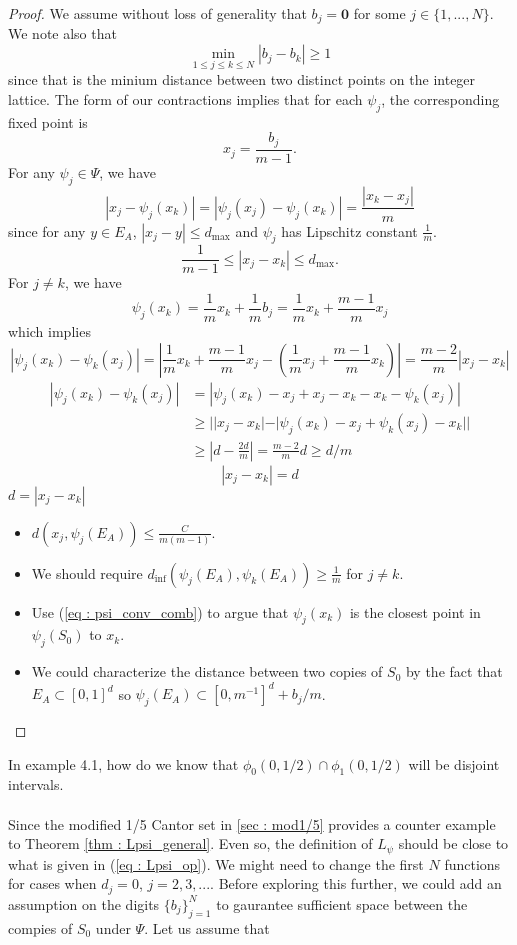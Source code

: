 \documentclass [52pt] {article}
\begin{document}
\begin{proof}
We assume without loss of generality that $b_j = \mathbf{0}$ for some $j\in\{1,...,N\}$.  We note also that 
\[\min_{1\le j\le k\le N}|b_j - b_k| \ge 1\]
since that is the minium distance between two distinct points on the integer lattice.  The form of our contractions implies that for each $\psi_j$, the corresponding fixed point is 
\[x_j = \frac{b_j}{m-1}.\]
For any $\psi_j\in\Psi$, we have
\[|x_j-\psi_j(x_k)|= |\psi_j(x_j) - \psi_j(x_k)| = \frac{|x_k-x_j|}{m}\]
since for any $y\in E_A$, $|x_j-y|\le d_{\max}$ and $\psi_j$ has Lipschitz constant $\frac{1}{m}$.
\[\frac{1}{m-1}\le |x_j-x_k|\le d_{\max}.\]
For $j\not=k$, we have
\begin{equation}\label{eq : psi_conv_comb}
\psi_j(x_k) = \frac{1}{m}x_k+\frac{1}{m}b_j = \frac{1}{m}x_k+\frac{m-1}{m}x_j
\end{equation}
which implies
\[|\psi_j(x_k)-\psi_k(x_j)| = \left|\frac{1}{m}x_k+\frac{m-1}{m}x_j-\left(\frac{1}{m}x_j+\frac{m-1}{m}x_k\right)\right|=\frac{m-2}{m}|x_j-x_k|\]
\[\begin{split}
|\psi_j(x_k) -\psi_k(x_j)|&= |\psi_j(x_k)-x_j+x_j-x_k-x_k-\psi_k(x_j)|\\
&\ge ||x_j-x_k|-|\psi_j(x_k)-x_j +\psi_k(x_j)-x_k||\\
& \ge |d-\frac{2d}{m}| = \frac{m-2}{m}d\ge d/m
\end{split}\]
\[|x_j-x_k|=d\]
$d = |x_j-x_k|$

\begin{itemize}
\item $d(x_j,\psi_j(E_A))\le \frac{C}{m(m-1)}.$
\item We should require $d_{\inf}(\psi_j(E_A),\psi_k(E_A))\ge \frac{1}{m}$ for $j\not= k$.
\item Use (\ref{eq : psi_conv_comb}) to argue that $\psi_j(x_k)$ is the closest point in $\psi_j(S_0)$ to $x_k$.
\item We could characterize the distance between two copies of $S_0$ by the fact that $E_A\subset [0,1]^d$ so $\psi_j(E_A)\subset [0,m^{-1}]^d + b_j/m$.  
\end{itemize}

\end{proof}
In example 4.1, how do we know that $\phi_0(0,1/2)\cap\phi_1(0,1/2)$ will be disjoint intervals.
\\\\
Since the modified 1/5 Cantor set in \ref{sec : mod1/5} provides a counter example to Theorem \ref{thm : Lpsi_general}.  Even so, the definition of $L_\psi$ should be close to what is given in (\ref{eq : Lpsi_op}).  We might need to change the first $N$ functions for cases when $d_j = 0$, $j = 2,3,...$.  Before exploring this further, we could add an assumption on the digits $\{b_j\}_{j=1}^N$ to gaurantee sufficient space between the compies of $S_0$ under $\Psi$.  Let us assume that 
\end{document}

